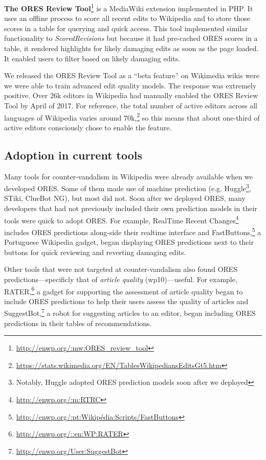 \textbf{The ORES Review Tool}\footnote{\url{http://enwp.org/:mw:ORES_review_tool}} is a MediaWiki extension implemented in PHP.  It uses an offline process to score all recent edits to Wikipedia and to store those scores in a table for querying and quick access.  This tool implemented similar functionality to \emph{ScoredRevisions} but because it had pre-cached ORES scores in a table, it rendered highlights for likely damaging edits as soon as the page loaded. It enabled users to filter based on likely damaging edits.

We released the ORES Review Tool as a ``beta feature'' on Wikimedia wikis were we were able to train advanced edit quality models.  The response was extremely positive.  Over 26k editors in Wikipedia had manually enabled the ORES Review Tool by April of 2017.  For reference, the total number of active editors across all languages of Wikipedia varies around 70k,\footnote{\url{https://stats.wikimedia.org/EN/TablesWikipediansEditsGt5.htm}} so this means that about one-third of active editors consciously chose to enable the feature.

\subsection{Adoption in current tools}
Many tools for counter-vandalism in Wikipedia were already available when we developed ORES.  Some of them made use of machine prediction (e.g. Huggle\footnote{Notably, Huggle adopted ORES prediction models soon after we deployed}, STiki, ClueBot NG), but most did not.  Soon after we deployed ORES, many developers that had not previously included their own prediction models in their tools were quick to adopt ORES.  For example, RealTime Recent Changes\footnote{\url{http://enwp.org/:m:RTRC}} includes ORES predictions along-side their realtime interface and FastButtons,\footnote{\url{http://enwp.org/:pt:Wikipédia:Scripts/FastButtons}} a Portuguese Wikipedia gadget, began displaying ORES predictions next to their buttons for quick reviewing and reverting damaging edits.

Other tools that were not targeted at counter-vandalism also found ORES predictions---specificly that of \emph{article quality} (wp10)---useful.  For example, RATER,\footnote{\url{http://enwp.org/::en:WP:RATER}} a gadget for supporting the assessment of article quality began to include ORES predictions to help their users assess the quality of articles and SuggestBot,\footnote{\url{http://enwp.org/User:SuggestBot}}\cite{cosley2007suggestbot} a robot for suggesting articles to an editor, began including ORES predictions in their tables of recommendations.

